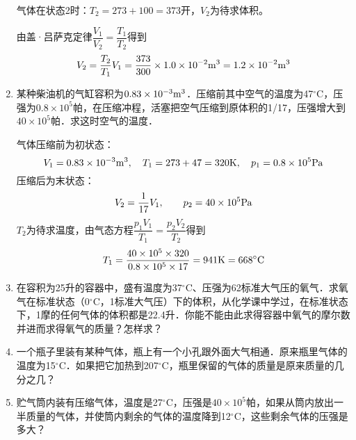 \begin{enumerate}
\begin{solution}
气体在状态2时：$T_2=273+100=373$开，$V_2$为待求体积。

由盖·吕萨克定律$\dfrac{V_1}{V_2}=\dfrac{T_1}{T_2}$得到
\[V_2=\frac{T_2}{T_1}V_1=\frac{373}{300}\times 1.0\times 10^{-2}{\rm m^3}=1.2\times 10^{-2}{\rm m^3}\]
\end{solution}
\item  某种柴油机的气缸容积为$0.83\times 10^{-3}{\rm m^3}$．压缩前其中空气的温度为47$^\circ$C，压强为$0.8\times 10^5$帕，在压缩冲程，活塞把空气压缩到原体积的1/17，压强增大到$40\times 10^5$帕．求这时空气的温度．

\begin{solution}
    气体压缩前为初状态：
\[V_1=0.83\times10^{-3}{\rm m^3},\quad T_1=273+47=320{\rm K},\quad p_1=0.8\times10^5{\rm Pa}\]
压缩后为末状态：
\[V_2=\frac{1}{17}V_1,\qquad  p_2=40\times10^5{\rm Pa}\]
$T_2$为待求温度，由气态方程$\dfrac{p_1V_1}{T_1}=\dfrac{p_2V_2}{T_2}$得到
\[T_1=\frac{40\times10^5\times320}{0.8\times10^5\times17}=941{\rm K}=668^{\circ}{\rm C}\]
\end{solution}
\item  在容积为25升的容器中，盛有温度为37$^\circ$C、压强为62标准大气压的氧气．求氧气在标准状态（0$^\circ$C，1标准大气压）下的体积，从化学课中学过，在标准状态下，1摩的任何气体的体积都是22.4升．你能不能由此求得容器中氧气的摩尔数并进而求得氧气的质量？怎样求？

\begin{solution}
    
\end{solution}
\item  一个瓶子里装有某种气体，瓶上有一个小孔跟外面大气相通．原来瓶里气体的温度为15$^\circ$C．如果把它加热到207$^\circ$C，瓶里保留的气体的质量是原来质量的几分之几？

\begin{solution}
    
\end{solution}
\item  贮气筒内装有压缩气体，温度是27$^\circ$C，压强是$40\times 10^5$帕，如果从筒内放出一半质量的气体，并使筒内剩余的气体的温度降到12$^\circ$C，这些剩余气体的压强是多大？


\begin{solution}
    
\end{solution}
\end{enumerate}




